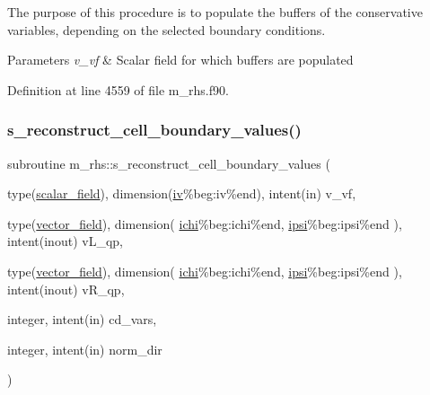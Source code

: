 The purpose of this procedure is to populate the buffers of the conservative variables, depending on the selected boundary conditions. 


\begin{DoxyParams}{Parameters}
{\em v\+\_\+vf} & Scalar field for which buffers are populated \\
\hline
\end{DoxyParams}


Definition at line 4559 of file m\+\_\+rhs.\+f90.

\mbox{\label{namespacem__rhs_ac5aa3e8228234f05fd5b899a6d309260}} 
\subsubsection{\texorpdfstring{s\+\_\+reconstruct\+\_\+cell\+\_\+boundary\+\_\+values()}{s\_reconstruct\_cell\_boundary\_values()}}
{\footnotesize\ttfamily subroutine m\+\_\+rhs\+::s\+\_\+reconstruct\+\_\+cell\+\_\+boundary\+\_\+values (\begin{DoxyParamCaption}\item[{type(\hyperlink{structm__derived__types_1_1scalar__field}{scalar\+\_\+field}), dimension(\hyperlink{namespacem__rhs_a4ab97e22609b5ebbb97524ca7bae05ef}{iv}\%beg\+:iv\%end), intent(in)}]{v\+\_\+vf,  }\item[{type(\hyperlink{structm__derived__types_1_1vector__field}{vector\+\_\+field}), dimension( \hyperlink{namespacem__rhs_ad2b935d288f68dbde65021da0498007d}{ichi}\%beg\+:ichi\%end,                          \hyperlink{namespacem__rhs_ae55731ba38044366ff7ddecf95297657}{ipsi}\%beg\+:ipsi\%end ), intent(inout)}]{v\+L\+\_\+qp,  }\item[{type(\hyperlink{structm__derived__types_1_1vector__field}{vector\+\_\+field}), dimension( \hyperlink{namespacem__rhs_ad2b935d288f68dbde65021da0498007d}{ichi}\%beg\+:ichi\%end,                          \hyperlink{namespacem__rhs_ae55731ba38044366ff7ddecf95297657}{ipsi}\%beg\+:ipsi\%end ), intent(inout)}]{v\+R\+\_\+qp,  }\item[{integer, intent(in)}]{cd\+\_\+vars,  }\item[{integer, intent(in)}]{norm\+\_\+dir }\end{DoxyParamCaption})}



